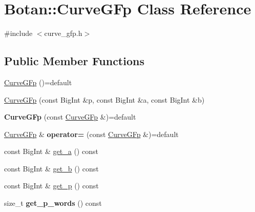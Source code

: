 \hypertarget{class_botan_1_1_curve_g_fp}{}\section{Botan\+:\+:Curve\+G\+Fp Class Reference}
\label{class_botan_1_1_curve_g_fp}


{\ttfamily \#include $<$curve\+\_\+gfp.\+h$>$}

\subsection*{Public Member Functions}
\begin{DoxyCompactItemize}
\item 
\mbox{\hyperlink{class_botan_1_1_curve_g_fp_aa040fce271ca5bcff4b19717aae958a2}{Curve\+G\+Fp}} ()=default
\item 
\mbox{\hyperlink{class_botan_1_1_curve_g_fp_aaeb72bf32cd4e5169be11094c244f92b}{Curve\+G\+Fp}} (const Big\+Int \&p, const Big\+Int \&a, const Big\+Int \&b)
\item 
\mbox{\label{class_botan_1_1_curve_g_fp_a0827d9e3a5e78669d53b85591985ec26}} 
{\bfseries Curve\+G\+Fp} (const \mbox{\hyperlink{class_botan_1_1_curve_g_fp}{Curve\+G\+Fp}} \&)=default
\item 
\mbox{\label{class_botan_1_1_curve_g_fp_a68e202327c9eb8e76b8291750f4bdce7}} 
\mbox{\hyperlink{class_botan_1_1_curve_g_fp}{Curve\+G\+Fp}} \& {\bfseries operator=} (const \mbox{\hyperlink{class_botan_1_1_curve_g_fp}{Curve\+G\+Fp}} \&)=default
\item 
const Big\+Int \& \mbox{\hyperlink{class_botan_1_1_curve_g_fp_a20794afb1e795f6c571bf535a875f588}{get\+\_\+a}} () const
\item 
const Big\+Int \& \mbox{\hyperlink{class_botan_1_1_curve_g_fp_ac5dfeca3af6f79d62334b1efd5392764}{get\+\_\+b}} () const
\item 
const Big\+Int \& \mbox{\hyperlink{class_botan_1_1_curve_g_fp_ae2fbbaf2290f610c23719a395e935f1e}{get\+\_\+p}} () const
\item 
\mbox{\label{class_botan_1_1_curve_g_fp_abf3dbc424a1738d64145be1e3183d271}} 
size\+\_\+t {\bfseries get\+\_\+p\+\_\+words} () const
\item 
\mbox{\label{class_botan_1_1_curve_g_fp_a21119bc97e1b671511030a58809f5e3b}} 

\end{DoxyCompactItemize}
